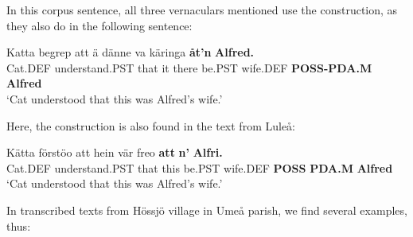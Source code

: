 In this corpus sentence, all three vernaculars mentioned use the  construction, as they also do in the following sentence:


\ea\label{}
\gll Katta  begrep  att  ä  dänne  va  käringa  \textbf{åt’n} \textbf{Alfred.}\\
Cat.DEF  understand.PST  that  it  there  be.PST  wife.DEF  \textbf{POSS-PDA.M} \textbf{Alfred}\\
\glt ‘Cat understood that this was Alfred’s wife.’
\z

Here, the construction is also found in the text from Luleå:


\ea\label{}
\gll Kätta  förstöo  att  hein  vär  freo  \textbf{att} \textbf{n’} \textbf{Alfri.}\\
Cat.DEF  understand.PST  that  this  be.PST  wife.DEF  \textbf{POSS} \textbf{PDA.M} \textbf{Alfred}\\
\glt ‘Cat understood that this was Alfred’s wife.’
\z

In transcribed texts from Hössjö village in Umeå parish, we find several examples, thus:


\ea\label{}

\z 
\z

